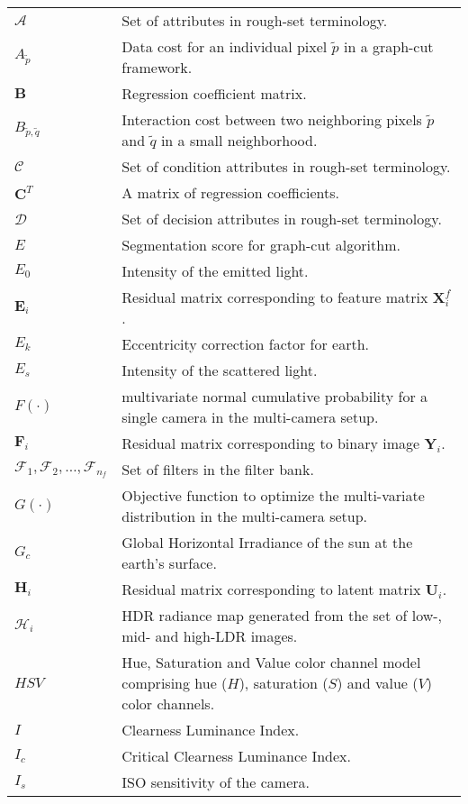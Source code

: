 \begin{longtable}[l]{p{80pt}p{320pt}}
$\mathcal{A}$ & Set of attributes in rough-set terminology. \\
$A_{\tilde{p}}$ & Data cost for an individual pixel $\tilde{p}$ in a graph-cut framework. \\
$\mathbf{B}$ & Regression coefficient matrix. \\
$B_{\tilde{p},\tilde{q}}$ & Interaction cost between two neighboring pixels $\tilde{p}$ and $\tilde{q}$ in a small neighborhood. \\
$\mathcal{C}$ & Set of condition attributes in rough-set terminology. \\
$\mathbf{C}^{T}$ & A matrix of regression coefficients. \\
$\mathcal{D}$ & Set of decision attributes in rough-set terminology. \\
$E$ & Segmentation score for graph-cut algorithm. \\
$E_0$ & Intensity of the emitted light. \\
$\mathbf{E}_{i}$ & Residual matrix corresponding to feature matrix $\mathbf{X}^{f}_{i}$. \\
$E_k$ & Eccentricity correction factor for earth. \\
$E_s$ & Intensity of the scattered light. \\
$F(\cdot)$ & multivariate normal cumulative probability for a single camera in the multi-camera setup.\\
$\mathbf{F}_{i}$ & Residual matrix corresponding to binary image $\mathbf{Y}_{i}$. \\
$\mathcal{F}_1, \mathcal{F}_2,\ldots,\mathcal{F}_{n_f}$ & Set of filters in the filter bank.\\
$G(\cdot)$ & Objective function to optimize the multi-variate distribution in the multi-camera setup.\\
$G_c$ & Global Horizontal Irradiance of the sun at the earth's surface. \\
$\mathbf{H}_{i}$ & Residual matrix corresponding to latent matrix $\mathbf{U}_{i}$. \\
$\mathcal{H}_i$ & HDR radiance map generated from the set of low-, mid- and high-LDR images. \\
$HSV$ & Hue, Saturation and Value color channel model comprising hue ($H$), saturation ($S$) and value ($V$) color channels. \\
$I$ & Clearness Luminance Index. \\
$I_c$ & Critical Clearness Luminance Index. \\
$I_{s}$ & ISO sensitivity of the camera. \\

\end{longtable}
